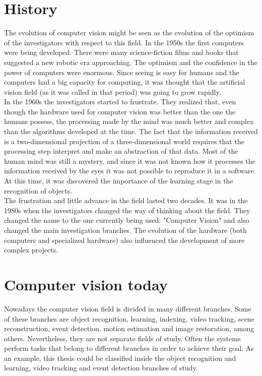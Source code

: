 \section{History}

The evolution of computer vision might be seen as the evolution of the optimism of the investigators with respect to this field. 
In the 1950s the first computers were being developed. There were many science-fiction films and books that suggested a new robotic era approaching. The optimism and the confidence in the power of computers were enormous. 
Since seeing is easy for humans and the computers had a big capacity for computing, it was thought that the artificial vision field (as it was called in that period) was going to grow rapidly. 
\\

In the 1960s the investigators started to frustrate. They realized that, even though the hardware used for computer vision was better than the one the humans possess, the processing made by the mind was much better and complex than the algorithms developed at the time. 
The fact that the information received is a two-dimensional projection of a three-dimensional world requires that the processing step interpret and make an abstraction of that data.
Most of the human mind was still a mystery, and since it was not known how it processes the information received by the eyes it was not possible to reproduce it in a software. 
At this time, it was discovered the importance of the learning stage in the recognition of objects. 
\\

The frustration and little advance in the field lasted two decades. It was in the 1980s when the investigators changed the way of thinking about the field. They changed the name to the one currently being used: "Computer Vision" and also changed the main investigation branches.
The evolution of the hardware (both computers and specialized hardware) also influenced the development of more complex projects. 
\\

\section{Computer vision today}

Nowadays the computer vision field is divided in many different branches. 
Some of these branches are object recognition, learning, indexing, video tracking, scene reconstruction, event detection, motion estimation and image restoration, among others. 
Nevertheless, they are not separate fields of study. 
Often the systems perform tasks that belong to different branches in order to achieve their goal. 
As an example, this thesis could be classified inside the object recognition and learning, video tracking and event detection branches of study. 
\\

